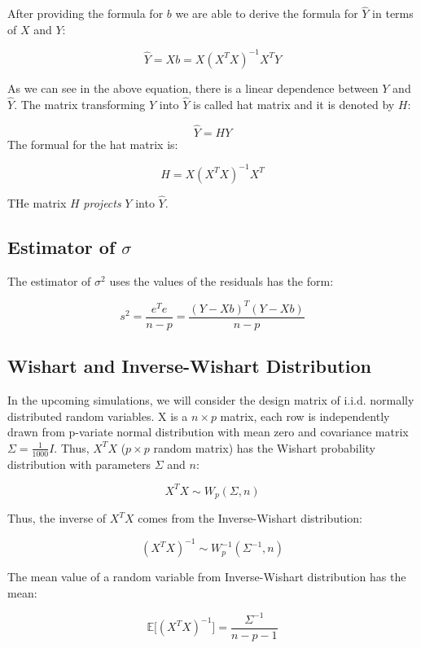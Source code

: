 \documentclass[
]{article}
\begin{document}
After providing the formula for \(b\) we are able to derive the formula
for \(\hat Y\) in terms of \(X\) and \(Y\):

\[\hat Y = Xb = X(X^TX)^{-1}X^TY\]

As we can see in the above equation, there is a linear dependence
between \(Y\) and \(\hat Y\). The matrix transforming \(Y\) into
\(\hat Y\) is called hat matrix and it is denoted by \(H\):

\[\hat Y = H Y\] The formual for the hat matrix is:

\[H = X(X^TX)^{-1}X^T\]

THe matrix \(H\) \emph{projects} \(Y\) into \(\hat Y\).

\hypertarget{estimator-of-sigma}{%
\subsection{\texorpdfstring{Estimator of
\(\sigma\)}{Estimator of \textbackslash sigma}}\label{estimator-of-sigma}}

The estimator of \(\sigma^2\) uses the values of the residuals has the
form:

\[s^2 = \frac {e^Te} {n-p} = \frac {(Y - Xb)^T(Y - Xb)} {n-p}\]

\hypertarget{wishart-and-inverse-wishart-distribution}{%
\subsection{Wishart and Inverse-Wishart
Distribution}\label{wishart-and-inverse-wishart-distribution}}

In the upcoming simulations, we will consider the design matrix of
i.i.d. normally distributed random variables. X is a \(n \times p\)
matrix, each row is independently drawn from p-variate normal
distribution with mean zero and covariance matrix
\(\Sigma = \frac 1 {1000}I\). Thus, \(X^TX\) (\(p \times p\) random
matrix) has the Wishart probability distribution with parameters
\(\Sigma\) and \(n\):

\[X^TX \sim W_p(\Sigma, n)\]

Thus, the inverse of \(X^TX\) comes from the Inverse-Wishart
distribution:

\[(X^TX)^{-1} \sim W_p^{-1} (\Sigma^{-1}, n)\]

The mean value of a random variable from Inverse-Wishart distribution
has the mean:

\[\mathbb E \big[(X^TX)^{-1} \big] = \frac {\Sigma^{-1}} {n - p - 1}\]
\end{document}
